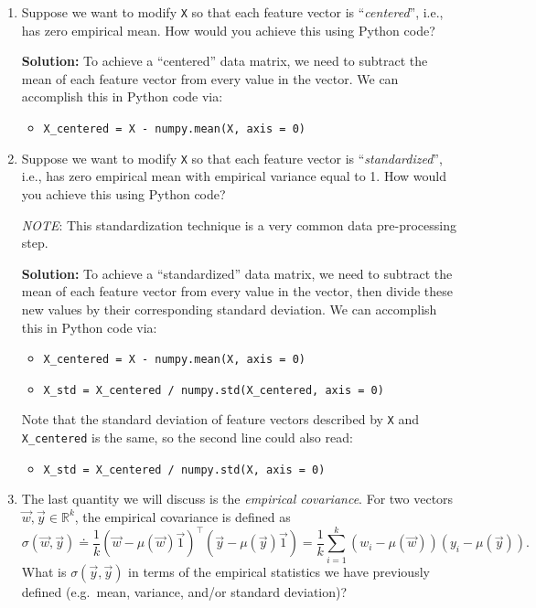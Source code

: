 \documentclass[10pt]{article}
\theoremstyle{definition}
\theoremstyle{plain}
\newcommand{\RR}{\mathbb{R}}
\begin{document}
\begin{enumerate}[label=(\alph*)]
\textbf{Solution:} As above, the vector has length $d$, and can be computed via
\begin{enumerate}[label=\roman*.]
\item \texttt{sigma = numpy.std(X, axis = 0)}
\end{enumerate}

\item Suppose we want to modify \texttt{X} so that each feature vector is ``\textit{centered}'', i.e., has zero empirical mean. How would you achieve this using Python code?

\textbf{Solution:} To achieve a ``centered'' data matrix, we need to subtract the mean of each feature vector from every value in the vector. We can accomplish this in Python code via:
\begin{itemize}
\item \texttt{X\_centered = X - numpy.mean(X, axis = 0)}
\end{itemize}

\item Suppose we want to modify \texttt{X} so that each feature vector is ``\textit{standardized}'', i.e., has zero empirical mean with empirical variance equal to 1. How would you achieve this using Python code?

\textit{NOTE}: This standardization technique is a very common data pre-processing step.

\textbf{Solution:} To achieve a ``standardized'' data matrix, we need to subtract the mean of each feature vector from every value in the vector, then divide these new values by their corresponding standard deviation. We can accomplish this in Python code via:
\begin{itemize}
\item \texttt{X\_centered = X - numpy.mean(X, axis = 0)}
\item \texttt{X\_std = X\_centered / numpy.std(X\_centered, axis = 0)}
\end{itemize}
Note that the standard deviation of feature vectors described by \texttt{X} and \texttt{X\_centered} is the same, so the second line could also read:
\begin{itemize}
\item \texttt{X\_std = X\_centered / numpy.std(X, axis = 0)}
\end{itemize}

\item The last quantity we will discuss is the \textit{empirical covariance}. For two vectors $\vec{w}, \vec{y} \in \RR^k$, the empirical covariance is defined as
\begin{equation}
\sigma(\vec{w}, \vec{y}) \doteq \frac{1}{k} \left( \vec{w} - \mu(\vec{w})\vec{1} \right)^\top \left( \vec{y} - \mu(\vec{y})\vec{1} \right) = \frac{1}{k} \sum_{i=1}^{k} (w_i - \mu(\vec{w}))(y_i - \mu(\vec{y})).
\end{equation}
What is $\sigma(\vec{y}, \vec{y})$ in terms of the empirical statistics we have previously defined (e.g.\ mean, variance, and/or standard deviation)?


\end{enumerate}
\end{document}
